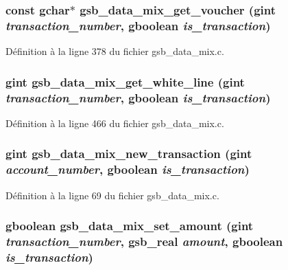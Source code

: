 \subsubsection[{gsb\_\-data\_\-mix\_\-get\_\-voucher}]{\setlength{\rightskip}{0pt plus 5cm}const gchar$\ast$ gsb\_\-data\_\-mix\_\-get\_\-voucher (gint {\em transaction\_\-number}, \/  gboolean {\em is\_\-transaction})}\label{gsb__data__mix_8c_a0dd263006adf896881cca980f22d06c8}


Définition à la ligne 378 du fichier gsb\_\-data\_\-mix.c.

\subsubsection[{gsb\_\-data\_\-mix\_\-get\_\-white\_\-line}]{\setlength{\rightskip}{0pt plus 5cm}gint gsb\_\-data\_\-mix\_\-get\_\-white\_\-line (gint {\em transaction\_\-number}, \/  gboolean {\em is\_\-transaction})}\label{gsb__data__mix_8c_a3dc82f9e36f410db25ad621d29312453}


Définition à la ligne 466 du fichier gsb\_\-data\_\-mix.c.

\subsubsection[{gsb\_\-data\_\-mix\_\-new\_\-transaction}]{\setlength{\rightskip}{0pt plus 5cm}gint gsb\_\-data\_\-mix\_\-new\_\-transaction (gint {\em account\_\-number}, \/  gboolean {\em is\_\-transaction})}\label{gsb__data__mix_8c_a5714cbc7cb820305d7ac6cf5b114d47e}


Définition à la ligne 69 du fichier gsb\_\-data\_\-mix.c.

\subsubsection[{gsb\_\-data\_\-mix\_\-set\_\-amount}]{\setlength{\rightskip}{0pt plus 5cm}gboolean gsb\_\-data\_\-mix\_\-set\_\-amount (gint {\em transaction\_\-number}, \/  {\bf gsb\_\-real} {\em amount}, \/  gboolean {\em is\_\-transaction})}\label{gsb__data__mix_8c_a022e6c0c15e4571efdc96764aa91319c}


